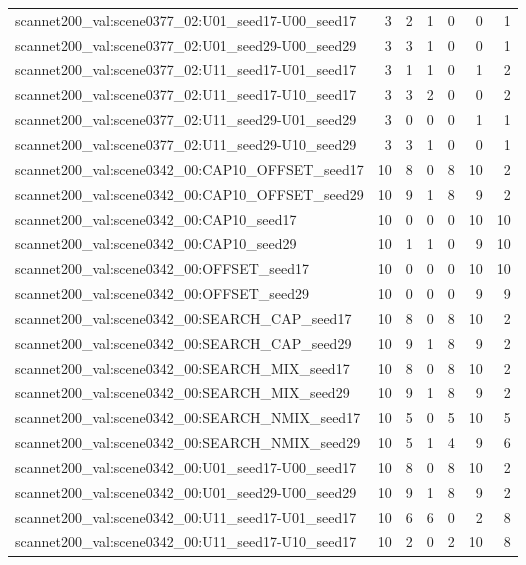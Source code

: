 \begin{table}[t]
\begin{tabular}{lrrrrrr}
scannet200\_val:scene0377\_02:U01\_seed17-U00\_seed17 & 3 & 2 & 1 & 0 & 0 & 1 \\
scannet200\_val:scene0377\_02:U01\_seed29-U00\_seed29 & 3 & 3 & 1 & 0 & 0 & 1 \\
scannet200\_val:scene0377\_02:U11\_seed17-U01\_seed17 & 3 & 1 & 1 & 0 & 1 & 2 \\
scannet200\_val:scene0377\_02:U11\_seed17-U10\_seed17 & 3 & 3 & 2 & 0 & 0 & 2 \\
scannet200\_val:scene0377\_02:U11\_seed29-U01\_seed29 & 3 & 0 & 0 & 0 & 1 & 1 \\
scannet200\_val:scene0377\_02:U11\_seed29-U10\_seed29 & 3 & 3 & 1 & 0 & 0 & 1 \\
scannet200\_val:scene0342\_00:CAP10\_OFFSET\_seed17 & 10 & 8 & 0 & 8 & 10 & 2 \\
scannet200\_val:scene0342\_00:CAP10\_OFFSET\_seed29 & 10 & 9 & 1 & 8 & 9 & 2 \\
scannet200\_val:scene0342\_00:CAP10\_seed17 & 10 & 0 & 0 & 0 & 10 & 10 \\
scannet200\_val:scene0342\_00:CAP10\_seed29 & 10 & 1 & 1 & 0 & 9 & 10 \\
scannet200\_val:scene0342\_00:OFFSET\_seed17 & 10 & 0 & 0 & 0 & 10 & 10 \\
scannet200\_val:scene0342\_00:OFFSET\_seed29 & 10 & 0 & 0 & 0 & 9 & 9 \\
scannet200\_val:scene0342\_00:SEARCH\_CAP\_seed17 & 10 & 8 & 0 & 8 & 10 & 2 \\
scannet200\_val:scene0342\_00:SEARCH\_CAP\_seed29 & 10 & 9 & 1 & 8 & 9 & 2 \\
scannet200\_val:scene0342\_00:SEARCH\_MIX\_seed17 & 10 & 8 & 0 & 8 & 10 & 2 \\
scannet200\_val:scene0342\_00:SEARCH\_MIX\_seed29 & 10 & 9 & 1 & 8 & 9 & 2 \\
scannet200\_val:scene0342\_00:SEARCH\_NMIX\_seed17 & 10 & 5 & 0 & 5 & 10 & 5 \\
scannet200\_val:scene0342\_00:SEARCH\_NMIX\_seed29 & 10 & 5 & 1 & 4 & 9 & 6 \\
scannet200\_val:scene0342\_00:U01\_seed17-U00\_seed17 & 10 & 8 & 0 & 8 & 10 & 2 \\
scannet200\_val:scene0342\_00:U01\_seed29-U00\_seed29 & 10 & 9 & 1 & 8 & 9 & 2 \\
scannet200\_val:scene0342\_00:U11\_seed17-U01\_seed17 & 10 & 6 & 6 & 0 & 2 & 8 \\
scannet200\_val:scene0342\_00:U11\_seed17-U10\_seed17 & 10 & 2 & 0 & 2 & 10 & 8 \\

\end{tabular}
\end{table}
